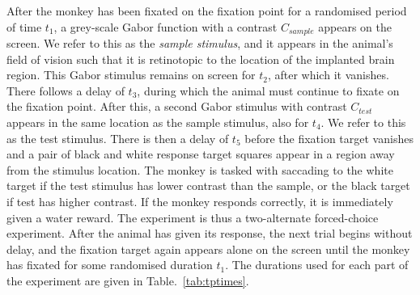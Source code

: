 After the monkey has been fixated on the fixation point for a randomised period of time
$t_1$,
a grey-scale Gabor function with a contrast $C_{sample}$ appears on the screen.
We refer to this as the \textit{sample stimulus}, and it appears in the animal's field of vision such that it is retinotopic to the location of the implanted brain region.
This Gabor stimulus remains on screen for $t_2$, after which it vanishes.
There follows a delay of $t_3$, during which the animal must continue to fixate on the fixation point.
After this, a second Gabor stimulus with contrast $C_{test}$ appears in the same location as the sample stimulus, also for $t_4$.
We refer to this as the test stimulus.
There is then a delay of $t_5$ before the fixation target vanishes and a pair of black and white response target squares appear in a region away from the stimulus location.
The monkey is tasked with saccading to the white target if the test stimulus has lower contrast than the sample, or the black target if test has higher contrast.
If the monkey responds correctly, it is immediately given a water reward.
The experiment is thus a two-alternate forced-choice experiment.
After the animal has given its response, the next trial begins without delay, and the fixation target again appears alone on the screen until the monkey has fixated for some randomised duration $t_1$.
The durations used for each part of the experiment are given in Table.~\ref{tab:tptimes}.

